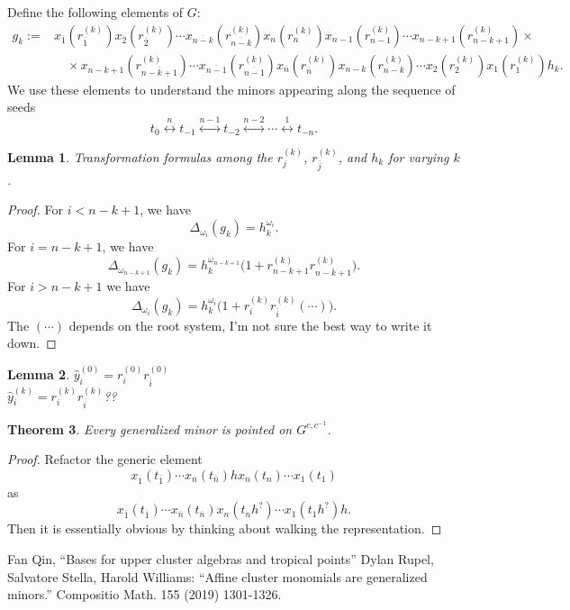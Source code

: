 \documentclass{amsart}
\newtheorem{theorem}{Theorem}
\newtheorem{lemma}[theorem]{Lemma}
\newcommand{\ol}[1]{\overline{#1}}
\begin{document}
    Define the following elements of $G$:
    \begin{align}
      \label{eq:generic factorizations}
      g_k:=&x_{\ol{1}}(r_{\ol{1}}^{(k)}) x_{\ol{2}}(r_{\ol{2}}^{(k)}) \cdots x_{\ol{n-k}}(r_{\ol{n-k}}^{(k)}) x_n(r_n^{(k)}) x_{n-1}(r_{n-1}^{(k)}) \cdots x_{n-k+1}(r_{n-k+1}^{(k)})\times\\
      \nonumber & \quad \times x_{\ol{n-k+1}}(r_{\ol{n-k+1}}^{(k)}) \cdots x_{\ol{n-1}}(r_{\ol{n-1}}^{(k)}) x_{\ol{n}}(r_{\ol{n}}^{(k)}) x_{n-k}(r_{n-k}^{(k)}) \cdots x_2(r_2^{(k)}) x_1(r_1^{(k)}) h_k.
    \end{align}
    We use these elements to understand the minors appearing along the sequence of seeds
    \[t_0 \stackrel{n}{\longleftrightarrow} t_{-1} \stackrel{n-1}{\longleftrightarrow} t_{-2} \stackrel{n-2}{\longleftrightarrow} \cdots \stackrel{1}{\longleftrightarrow} t_{-n}.\]
    \begin{lemma}
      Transformation formulas among the $r_j^{(k)}$, $r_{\ol{j}}^{(k)}$, and $h_k$ for varying $k$.
    \end{lemma}
    \begin{proof}
      For $i<n-k+1$, we have
      \[\Delta_{\omega_i}(g_k)=h_k^{\omega_i}.\]
      For $i=n-k+1$, we have
      \[\Delta_{\omega_{n-k+1}}(g_k)=h_k^{\omega_{n-k+1}}\big(1+r_{n-k+1}^{(k)}r_{\ol{n-k+1}}^{(k)}\big).\]
      For $i>n-k+1$ we have
      \[\Delta_{\omega_i}(g_k)=h_k^{\omega_i}\big(1+r_i^{(k)}r_{\ol{i}}^{(k)}(\cdots)\big).\]
      The $(\cdots)$ depends on the root system, I'm not sure the best way to write it down.
    \end{proof}

    \begin{lemma}
      $\hat y_i^{(0)}=r_i^{(0)} r_{\ol{i}}^{(0)}$\\
      $\hat y_i^{(k)}=r_i^{(k)} r_{\ol{i}}^{(k)}$??\\
    \end{lemma}
    \begin{theorem}
      Every generalized minor is pointed on $G^{c,c^{-1}}$.
    \end{theorem}
    \begin{proof}
      Refactor the generic element 
      \[x_{\ol{1}}(t_{\ol{1}})\cdots x_{\ol{n}}(t_{\ol{n}})h x_n(t_n)\cdots x_1(t_1)\]
      as
      \[x_{\ol{1}}(t_{\ol{1}})\cdots x_{\ol{n}}(t_{\ol{n}}) x_n(t_nh^{?})\cdots x_1(t_1h^{?}) h.\]
      Then it is essentially obvious by thinking about walking the representation.
    \end{proof}

  \begin{thebibliography}{XXX}
     Fan Qin, ``Bases for upper cluster algebras and tropical points''
     Dylan Rupel, Salvatore Stella, Harold Williams: ``Affine cluster monomials are generalized minors.'' Compositio Math. 155 (2019) 1301-1326. 
  \end{thebibliography}
\end{document}
